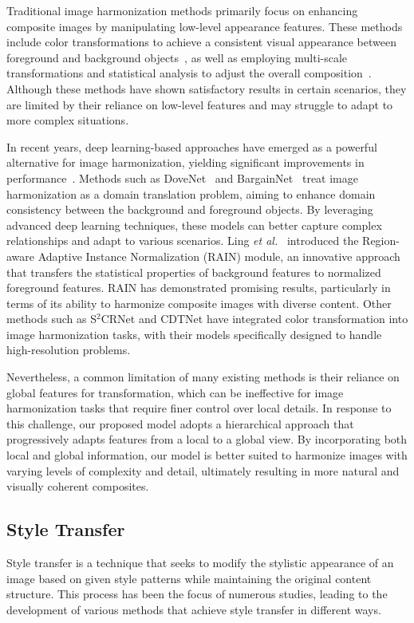 \documentclass[sigconf]{acmart}
\begin{document}
Traditional image harmonization methods primarily focus on enhancing composite images by manipulating low-level appearance features. These methods include color transformations to achieve a consistent visual appearance between foreground and background objects~\cite{CT,xue2012TG}, as well as employing multi-scale transformations and statistical analysis to adjust the overall composition~\cite{sunkavalli2010multi}. Although these methods have shown satisfactory results in certain scenarios, they are limited by their reliance on low-level features and may struggle to adapt to more complex situations.

In recent years, deep learning-based approaches have emerged as a powerful alternative for image harmonization, yielding significant improvements in performance~\cite{Bargainnet,DIH,IHT,GuoZJGZ21,CDTNet,Harmonizer,liang2021spatial}. Methods such as DoveNet~\cite{DoveNet} and BargainNet~\cite{Bargainnet} treat image harmonization as a domain translation problem, aiming to enhance domain consistency between the background and foreground objects. By leveraging advanced deep learning techniques, these models can better capture complex relationships and adapt to various scenarios. Ling \textit{et al.}~\cite{RAIN} introduced the Region-aware Adaptive Instance Normalization (RAIN) module, an innovative approach that transfers the statistical properties of background features to normalized foreground features. RAIN has demonstrated promising results, particularly in terms of its ability to harmonize composite images with diverse content. Other methods such as S$^2$CRNet and CDTNet have integrated color transformation into image harmonization tasks, with their models specifically designed to handle high-resolution problems.

Nevertheless, a common limitation of many existing methods is their reliance on global features for transformation, which can be ineffective for image harmonization tasks that require finer control over local details. In response to this challenge, our proposed model adopts a hierarchical approach that progressively adapts features from a local to a global view. By incorporating both local and global information, our model is better suited to harmonize images with varying levels of complexity and detail, ultimately resulting in more natural and visually coherent composites.

\subsection{Style Transfer}
Style transfer is a technique that seeks to modify the stylistic appearance of an image based on given style patterns while maintaining the original content structure. This process has been the focus of numerous studies, leading to the development of various methods that achieve style transfer in different ways.
\end{document}
